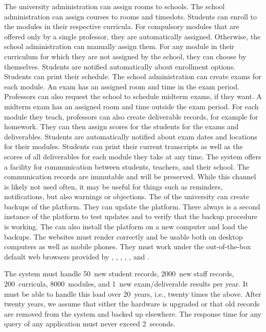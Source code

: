 The university administration can assign rooms to schools.
The school administration can assign courses to rooms and timeslots.%
\endhsection%
%
%
Students can enroll to the modules in their respective curricula.
For compulsory modules that are offered only by a single professor, they are automatically assigned.
Otherwise, the school administration can manually assign them.
For any module in their curriculum for which they are not assigned by the school, they can choose by themselves.
Students are notified automatically about enrollment options.
Students can print their schedule.%
\endhsection%
%
%
The school administration can create exams for each module.
An exam has an assigned room and time in the exam period.
Professors can also request the school to schedule midterm exams, if they want.
A midterm exam has an assigned room and time outside the exam period.
For each module they teach, professors can also create deliverable records, for example for homework.
They can then assign scores for the students for the exams and deliverables.
Students are automatically notified about exam dates and locations for their modules.
Students can print their current transcripts as well as the scores of all deliverables for each module they take at any time.
\endhsection%
%
%
The system offers a facility for communication between students, teachers, and their school.
The communication records are immutable and will be preserved.
While this channel is likely not used often, it may be useful for things such as reminders, notifications, but also warnings or objections.%
\endhsection%
%
%
The  of the university can create backups of the platform.
They can update the platform.
There always is a second instance of the platform to test updates and to verify that the backup procedure is working.
The  can also install the platform on a new computer and load the backups.%
\endhsection%
\endhsection%
%
%
The websites must render correctly and be usable both on desktop computers as well as mobile phones.
They must work under the out-of-the-box default web browsers provided by \microsoftWindows, \linux, \macOS, \appleIOS, \iPadOS, and \android.

The system must handle 50~new student records, 2000~new staff records, 200~curricula, 8000~modules, and 1~new exam/deliverable results per year.
It must be able to handle this load over 20~years, i.e., twenty times the above.
After twenty years, we assume that either the hardware is upgraded or that old records are removed from the system and backed up elsewhere.
The response time for any query of any application must never exceed 2~seconds.

